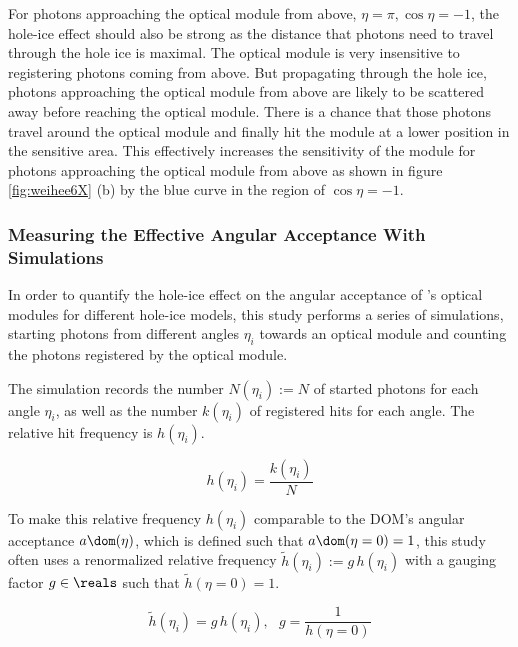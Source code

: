 For photons approaching the optical module from above, $\eta = \pi, \cos \eta = -1$, the hole-ice effect should also be strong as the distance that photons need to travel through the hole ice is maximal. The optical module is very insensitive to registering photons coming from above. But propagating through the hole ice, photons approaching the optical module from above are likely to be scattered away before reaching the optical module. There is a chance that those photons travel around the optical module and finally hit the module at a lower position in the sensitive area. This effectively increases the sensitivity of the module for photons approaching the optical module from above as shown in figure \ref{fig:weihee6X} (b) by the blue curve in the region of $\cos \eta = -1$.


\subsubsection{Measuring the Effective Angular Acceptance With Simulations}
\label{sec:measuring_angular_acceptance_with_simulations}\label{sec:gauging}

In order to quantify the hole-ice effect on the angular acceptance of \icecube's optical modules for different hole-ice models, this study performs a series of simulations, starting photons from different angles $\eta_i$ towards an optical module and counting the photons registered by the optical module.

The simulation records the number $N(\eta_i):= N$ of started photons for each angle $\eta_i$, as well as the number $k(\eta_i)$ of registered hits for each angle. The relative hit frequency is $h(\eta_i)$.

\begin{equation}
  h(\eta_i) = \frac{k(\eta_i)}{N}
\end{equation}

To make this relative frequency $h(\eta_i)$ comparable to the DOM's angular acceptance $a\dom(\eta)$, which is defined such that $a\dom(\eta = 0) = 1$, this study often uses a renormalized relative frequency $\tilde{h}(\eta_i):=g\,h(\eta_i)$ with a gauging factor $g\in\reals$ such that $\tilde{h}(\eta = 0) = 1$.

\begin{equation}
  \tilde{h}(\eta_i) = g\,h(\eta_i), \ \ \
  g = \frac{1}{h(\eta = 0)}
  \label{eq:gauging_factor}
\end{equation}



